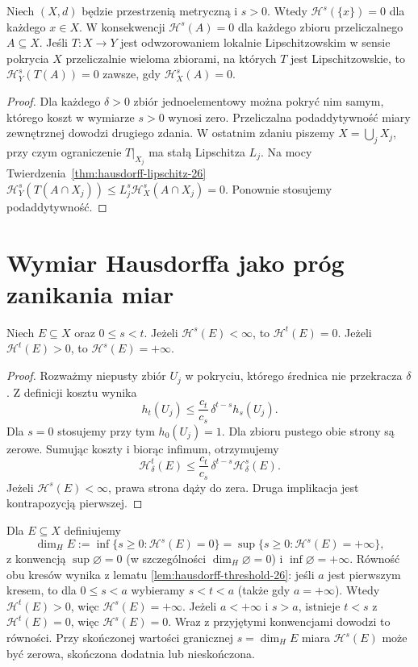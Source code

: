 \begin{wniosek}
\label{cor:hausdorff-singletons-auditVI}
Niech $(X,d)$ będzie przestrzenią metryczną i $s>0$.
Wtedy $\mathcal H^s(\{x\})=0$ dla każdego $x\in X$.
W konsekwencji $\mathcal H^s(A)=0$ dla każdego zbioru
przeliczalnego $A\subseteq X$. Jeśli $T:X\to Y$ jest
odwzorowaniem lokalnie Lipschitzowskim w sensie pokrycia
$X$ przeliczalnie wieloma zbiorami, na których $T$
jest Lipschitzowskie, to
$\mathcal H_Y^s(T(A))=0$ zawsze, gdy $\mathcal H_X^s(A)=0$.
\end{wniosek}
\begin{proof}
Dla każdego $\delta>0$ zbiór jednoelementowy
można pokryć nim samym, którego koszt w wymiarze
$s>0$ wynosi zero. Przeliczalna podaddytywność
miary zewnętrznej dowodzi drugiego zdania.
W ostatnim zdaniu piszemy $X=\bigcup_jX_j$,
przy czym ograniczenie $T|_{X_j}$ ma stałą
Lipschitza $L_j$. Na mocy
Twierdzenia~\ref{thm:hausdorff-lipschitz-26}
$\mathcal H_Y^s(T(A\cap X_j))\le
L_j^s\mathcal H_X^s(A\cap X_j)=0$.
Ponownie stosujemy podaddytywność.
\end{proof}

\section{Wymiar Hausdorffa jako próg zanikania miar}
\begin{lemat}
\label{lem:hausdorff-threshold-26}
Niech $E\subseteq X$ oraz $0\le s<t$. Jeżeli
$\mathcal H^s(E)<\infty$, to $\mathcal H^t(E)=0$.
Jeżeli $\mathcal H^t(E)>0$, to $\mathcal H^s(E)=+\infty$.
\end{lemat}
\begin{proof}
Rozważmy niepusty zbiór $U_j$ w pokryciu,
którego średnica nie przekracza $\delta$.
Z definicji kosztu wynika
\[
 h_t(U_j)\le\frac{c_t}{c_s}\,\delta^{t-s}h_s(U_j).
\]
Dla $s=0$ stosujemy przy tym $h_0(U_j)=1$.
Dla zbioru pustego obie strony są zerowe.
Sumując koszty i biorąc infimum, otrzymujemy
\[
\mathcal H^t_\delta(E)\le
\frac{c_t}{c_s}\,\delta^{t-s}\mathcal H^s_\delta(E).
\]
Jeżeli $\mathcal H^s(E)<\infty$, prawa strona dąży
do zera. Druga implikacja jest kontrapozycją pierwszej.
\end{proof}

\begin{definicja}
\label{def:hausdorff-dimension-26}
Dla $E\subseteq X$ definiujemy
\[
 \dim_H E:=\inf\{s\ge0:\mathcal H^s(E)=0\}
 =\sup\{s\ge0:\mathcal H^s(E)=+\infty\},
\]
z konwencją $\sup\varnothing=0$ (w szczególności
$\dim_H\varnothing=0$) i $\inf\varnothing=+\infty$.
Równość obu kresów wynika z lematu
\ref{lem:hausdorff-threshold-26}: jeśli $a$ jest
pierwszym kresem, to dla $0\le s<a$ wybieramy
$s<t<a$ (także gdy $a=+\infty$). Wtedy
$\mathcal H^t(E)>0$, więc $\mathcal H^s(E)=+\infty$.
Jeżeli $a<+\infty$ i $s>a$, istnieje $t<s$
z $\mathcal H^t(E)=0$, więc $\mathcal H^s(E)=0$.
Wraz z przyjętymi konwencjami dowodzi to równości.
Przy skończonej wartości granicznej $s=\dim_H E$ miara
$\mathcal H^s(E)$ może być zerowa, skończona dodatnia
lub nieskończona.
\end{definicja}

